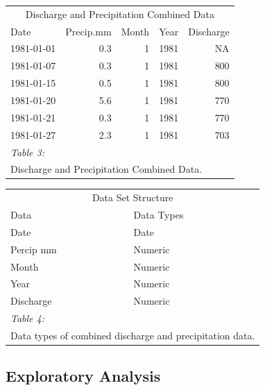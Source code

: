 \documentclass[
]{article}
\begin{document}
\begin{table}
\centering
\begin{tabular}[t]{l|r|r|r|r}
\hline
\multicolumn{5}{c}{Discharge and Precipitation Combined Data} \\
\cline{1-5}
Date & Precip.mm & Month & Year & Discharge\\
\hline
1981-01-01 & 0.3 & 1 & 1981 & NA\\
\hline
1981-01-07 & 0.3 & 1 & 1981 & 800\\
\hline
1981-01-15 & 0.5 & 1 & 1981 & 800\\
\hline
1981-01-20 & 5.6 & 1 & 1981 & 770\\
\hline
1981-01-21 & 0.3 & 1 & 1981 & 770\\
\hline
1981-01-27 & 2.3 & 1 & 1981 & 703\\
\hline
\multicolumn{5}{l}{\rule{0pt}{1em}\textit{Table 3: }}\\
\multicolumn{5}{l}{\rule{0pt}{1em}Discharge and Precipitation Combined Data.}\\
\end{tabular}
\end{table}

\begin{table}
\centering
\begin{tabular}[t]{l|l}
\hline
\multicolumn{2}{c}{Data Set Structure} \\
\cline{1-2}
Data & Data Types\\
\hline
Date & Date\\
\hline
Percip mm & Numeric\\
\hline
Month & Numeric\\
\hline
Year & Numeric\\
\hline
Discharge & Numeric\\
\hline
\multicolumn{2}{l}{\rule{0pt}{1em}\textit{Table 4: }}\\
\multicolumn{2}{l}{\rule{0pt}{1em}Data types of combined discharge and precipitation data.}\\
\end{tabular}
\end{table}

\newpage

\hypertarget{exploratory-analysis}{%
\subsection{\texorpdfstring{\textbf{Exploratory
Analysis}}{Exploratory Analysis}}\label{exploratory-analysis}}
\end{document}
